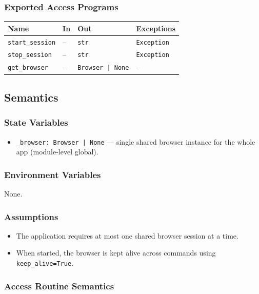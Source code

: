 \documentclass[12pt, titlepage]{article}
\begin{document}
\subsubsection{Exported Access Programs}

\begin{center}
\begin{tabular}{|l|l|l|l|}
\hline
\textbf{Name} & \textbf{In} & \textbf{Out} & \textbf{Exceptions} \\
\hline
\texttt{start\_session} & -- & \texttt{str} & \texttt{Exception} \\
\texttt{stop\_session} & -- & \texttt{str} & \texttt{Exception} \\
\texttt{get\_browser} & -- & \texttt{Browser | None} & -- \\
\hline
\end{tabular}
\end{center}

\subsection{Semantics}

\subsubsection{State Variables}
\begin{itemize}
  \item \texttt{\_browser: Browser | None} --- single shared browser instance for the whole app (module-level global).
\end{itemize}

\subsubsection{Environment Variables}
None.

\subsubsection{Assumptions}
\begin{itemize}
  \item The application requires at most one shared browser session at a time.
  \item When started, the browser is kept alive across commands using \texttt{keep\_alive=True}.
\end{itemize}

\subsubsection{Access Routine Semantics}
\end{document}
